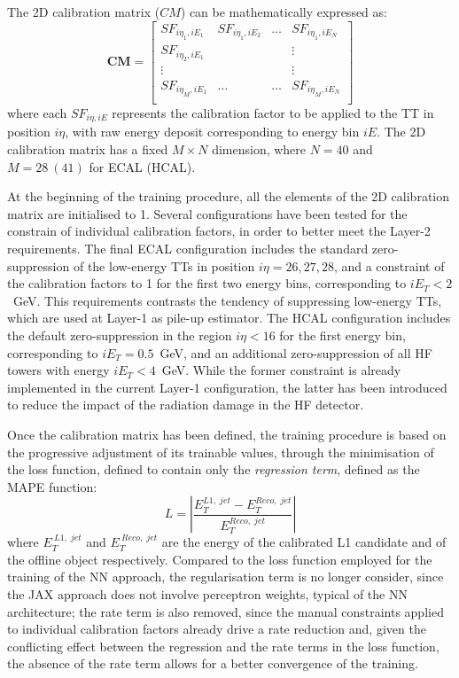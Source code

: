 The 2D calibration matrix ($CM$) can be mathematically expressed as:
\begin{equation}
    \textbf{CM} = \begin{bmatrix} 
    SF_{i\eta_1,iE_1} & SF_{i\eta_1,iE_2} & \dots & SF_{i\eta_1,iE_N} \\
    SF_{i\eta_2,iE_1} & & & \vdots \\
    \vdots & & & \vdots \\
    SF_{i\eta_M,iE_1} & \dots & \dots & SF_{i\eta_M,iE_N} \\
    \end{bmatrix}
\end{equation}
where each $SF_{i\eta,iE}$ represents the calibration factor to be applied to the TT in position $i\eta$, with raw energy deposit corresponding to energy bin $iE$. The 2D calibration matrix has a fixed $M\times N$ dimension, where $N=40$ and $M=28~(41)$ for ECAL (HCAL).

At the beginning of the training procedure, all the elements of the 2D calibration matrix are initialised to 1. Several configurations have been tested for the constrain of individual calibration factors, in order to better meet the Layer-2 requirements. 
The final ECAL configuration includes the standard zero-suppression of the low-energy TTs in position $i\eta=26,27,28$, and a constraint of the calibration factors to 1 for the first two energy bins, corresponding to $iE_T<2$~GeV.
This requirements contrasts the tendency of suppressing low-energy TTs, which are used at Layer-1 as pile-up estimator.
The HCAL configuration includes the default zero-suppression in the region $i\eta<16$ for the first energy bin, corresponding to $iE_T=0.5$~GeV, and an additional zero-suppression of all HF towers with energy $iE_T<4$~GeV. While the former constraint is already implemented in the current Layer-1 configuration, the latter has been introduced to reduce the impact of the radiation damage in the HF detector.

Once the calibration matrix has been defined, the training procedure is based on the progressive adjustment of its trainable values, through the minimisation of the loss function, defined to contain only the \textit{regression term}, defined as the MAPE function:
\begin{equation}
    L=\left|\frac{E_T^{L1,\;jet} - E_T^{Reco,\;jet}}{E_T^{Reco,\;jet}}\right|
\end{equation}
where $E_T^{\:L1,\;jet}$ and $E_T^{\:Reco,\;jet}$ are the energy of the calibrated L1 candidate and of the offline object respectively. 
Compared to the loss function employed for the training of the NN approach, the regularisation term is no longer consider, since the JAX approach does not involve perceptron weights, typical of the NN architecture; the rate term is also removed, since the manual constraints applied to individual calibration factors already drive a rate reduction and, given the conflicting effect between the regression and the rate terms in the loss function, the absence of the rate term allows for a better convergence of the training.

